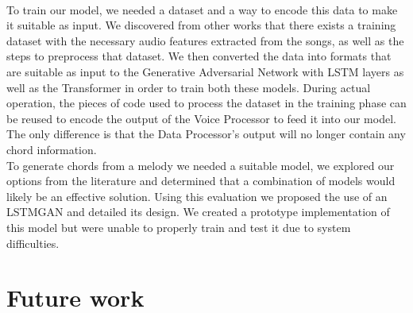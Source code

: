 \\
To train our model, we needed a dataset and a way to encode this data to make it suitable as input. 
We discovered from other works that there exists a training dataset with the necessary audio features extracted from the songs, as well as the steps to preprocess that dataset. 
We then converted the data into formats that are suitable as input to the Generative Adversarial Network with LSTM layers as well as the Transformer in order to train both these models. 
During actual operation, the pieces of code used to process the dataset in the training phase can be reused to encode the output of the Voice Processor to feed it into our model. 
The only difference is that the Data Processor’s output will no longer contain any chord information.
\\
To generate chords from a melody we needed a suitable model, we explored our options from the literature and determined that a combination of models would likely be an effective solution.
Using this evaluation we proposed the use of an LSTMGAN and detailed its design.
We created a prototype implementation of this model but were unable to properly train and test it due to system difficulties.

\section{Future work}


